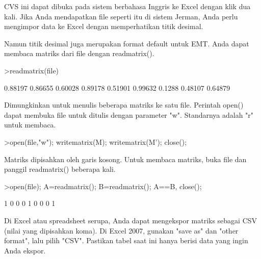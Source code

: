 \documentclass[a4paper,10pt]{article}
\begin{document}
\begin{eulernotebook}
\begin{eulercomment}
\begin{eulercomment}
\begin{eulercomment}
\begin{eulercomment}
\begin{eulercomment}
\begin{eulercomment}
\begin{eulercomment}
\begin{eulercomment}
\begin{eulercomment}
\begin{eulercomment}
\begin{eulercomment}
\begin{eulercomment}
\begin{eulercomment}
\begin{eulercomment}
\begin{euleroutput}
\end{euleroutput}
\begin{eulercomment}
CVS ini dapat dibuka pada sistem berbahasa Inggris ke Excel dengan
klik dua kali. Jika Anda mendapatkan file seperti itu di sistem
Jerman, Anda perlu mengimpor data ke Excel dengan memperhatikan titik
desimal.

Namun titik desimal juga merupakan format default untuk EMT. Anda
dapat membaca matriks dari file dengan readmatrix().
\end{eulercomment}
\begin{eulerprompt}
>readmatrix(file)
\end{eulerprompt}
\begin{euleroutput}
    0.88197   0.86655   0.60028 
    0.89178   0.51901   0.99632 
     0.1288   0.48107   0.64879 
\end{euleroutput}
\begin{eulercomment}
Dimungkinkan untuk menulis beberapa matriks ke satu file. Perintah
open() dapat membuka file untuk ditulis dengan parameter "w".
Standarnya adalah "r" untuk membaca.
\end{eulercomment}
\begin{eulerprompt}
>open(file,"w"); writematrix(M); writematrix(M'); close();
\end{eulerprompt}
\begin{eulercomment}
Matriks dipisahkan oleh garis kosong. Untuk membaca matriks, buka file
dan panggil readmatrix() beberapa kali.
\end{eulercomment}
\begin{eulerprompt}
>open(file); A=readmatrix(); B=readmatrix(); A==B, close();
\end{eulerprompt}
\begin{euleroutput}
          1         0         0 
          0         1         0 
          0         0         1 
\end{euleroutput}
\begin{eulercomment}
Di Excel atau spreadsheet serupa, Anda dapat mengekspor matriks
sebagai CSV (nilai yang dipisahkan koma). Di Excel 2007, gunakan "save
as" dan "other format", lalu pilih "CSV". Pastikan tabel saat ini
hanya berisi data yang ingin Anda ekspor.


\end{eulercomment}
\end{eulercomment}
\end{eulercomment}
\end{eulercomment}
\end{eulercomment}
\end{eulercomment}
\end{eulercomment}
\end{eulercomment}
\end{eulercomment}
\end{eulercomment}
\end{eulercomment}
\end{eulercomment}
\end{eulercomment}
\end{eulercomment}
\end{eulercomment}
\end{eulernotebook}
\end{document}
